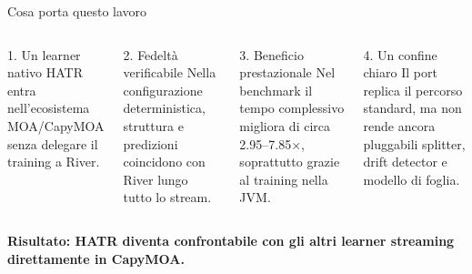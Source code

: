 \documentclass[aspectratio=169,10pt]{beamer}
\begin{document}
\begin{frame}{Cosa porta questo lavoro}
  \begin{columns}[T]
    \begin{block}{1. Un learner nativo}
      \small
      HATR entra nell'ecosistema MOA/CapyMOA senza delegare il training
      a River.
    \end{block}

    \begin{block}{2. Fedeltà verificabile}
      \small
      Nella configurazione deterministica, struttura e predizioni
      coincidono con River lungo tutto lo stream.
    \end{block}

    \begin{block}{3. Beneficio prestazionale}
      \small
      Nel benchmark il tempo complessivo migliora di circa
      2.95--7.85$\times$, soprattutto grazie al training nella JVM.
    \end{block}

    \begin{alertblock}{4. Un confine chiaro}
      \small
      Il port replica il percorso standard, ma non rende ancora
      pluggabili splitter, drift detector e modello di foglia.
    \end{alertblock}
  \end{columns}

  \medskip
  \centering
  \large
  \textbf{Risultato: HATR diventa confrontabile con gli altri learner
  streaming direttamente in CapyMOA.}
\end{frame}
\end{document}

